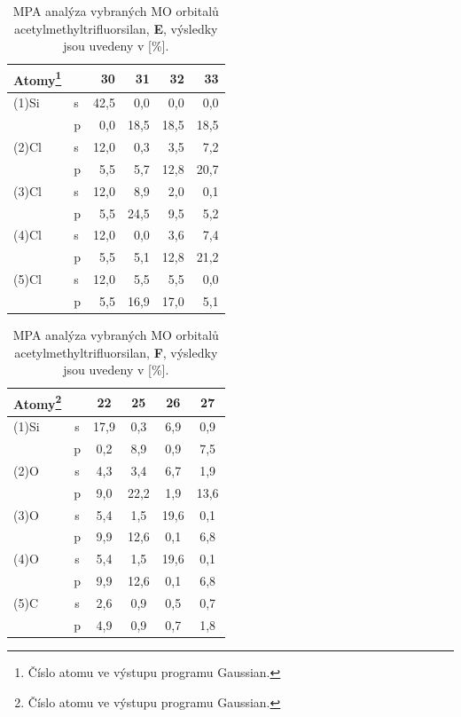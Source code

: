 \documentclass[
digital, %
table,   %
lof,     %
lot,     %
oneside,
]{fithesis3}
\begin{document}
\begin{table}[htbp] \begin{minipage}{\textwidth}
\begin{center}
\caption{MPA analýza vybraných MO orbitalů acetylmethyltrifluorsilan, \textbf{E}, výsledky jsou uvedeny v [\%].}
\begin{tabular}{|l|l|r|r|r|r|}
\hline
Atomy\footnote{Číslo atomu ve výstupu programu Gaussian.} \label{si_cl4} &  & 30 & 31 & 32 & 33 \\ \hline
(1)Si & s & 42,5  & 0,0  & 0,0  & 0,0  \\ \hline
& p & 0,0  & 18,5  & 18,5  & 18,5  \\ \hline
(2)Cl & s & 12,0  & 0,3  & 3,5  & 7,2  \\ \hline
& p & 5,5  & 5,7  & 12,8  & 20,7  \\ \hline
(3)Cl & s & 12,0  & 8,9  & 2,0  & 0,1  \\ \hline
& p & 5,5  & 24,5  & 9,5  & 5,2  \\ \hline
(4)Cl & s & 12,0  & 0,0  & 3,6  & 7,4  \\ \hline
& p & 5,5  & 5,1  & 12,8  & 21,2  \\ \hline
(5)Cl & s & 12,0  & 5,5  & 5,5  & 0,0  \\ \hline
& p & 5,5  & 16,9  & 17,0  & 5,1  \\ \hline
\end{tabular}\end{center}\end{minipage}\end{table}


\begin{table}[htbp] \begin{minipage}{\textwidth}
\caption{MPA analýza vybraných MO orbitalů acetylmethyltrifluorsilan, \textbf{F}, výsledky jsou uvedeny v [\%].}
\begin{center}
\begin{tabular}{|l|c|c|c|c|c|}
\hline
Atomy\footnote{Číslo atomu ve výstupu programu Gaussian.}\label{acetylmethyltrifluorsilan_MPA}&  & 22 & 25 & 26 & 27 \\ \hline
(1)Si & s & 17,9  & 0,3  & 6,9  & 0,9  \\ \hline
& p & 0,2  & 8,9  & 0,9  & 7,5  \\ \hline
(2)O & s & 4,3  & 3,4  & 6,7  & 1,9  \\ \hline
& p & 9,0  & 22,2  & 1,9  & 13,6  \\ \hline
(3)O & s & 5,4  & 1,5  & 19,6  & 0,1  \\ \hline
& p & 9,9  & 12,6  & 0,1  & 6,8  \\ \hline
(4)O & s & 5,4  & 1,5  & 19,6  & 0,1  \\ \hline
& p & 9,9  & 12,6  & 0,1  & 6,8  \\ \hline
(5)C & s & 2,6  & 0,9  & 0,5  & 0,7  \\ \hline
& p & 4,9  & 0,9  & 0,7  & 1,8  \\ \hline
\end{tabular}\end{center}\end{minipage}\end{table}
\end{document}
